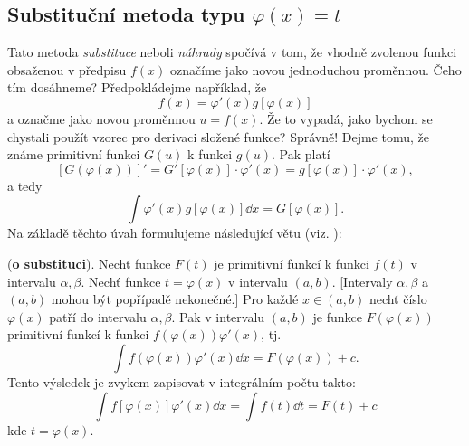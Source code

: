       
  
    \subsection{Substituční metoda typu \(\varphi(x) = t\)}
      Tato metoda \emph{substituce} neboli \emph{náhrady} spočívá v tom, že vhodně zvolenou funkci
      obsaženou v předpisu \(f(x)\) označíme jako novou jednoduchou proměnnou. Čeho tím dosáhneme?
      Předpokládejme například, že \[f(x)=\varphi'(x)g[\varphi(x)]\] a označme jako novou proměnnou
      \(u = f(x)\). Že to vypadá, jako bychom se chystali použít vzorec pro derivaci složené funkce?
      Správně! Dejme tomu, že známe primitivní funkci \(G(u)\) k funkci \(g(u)\). Pak platí
      \begin{equation*}
        \left[G\left(\varphi(x)\right)\right]' = G'\left[\varphi(x)\right]\cdot\varphi'(x) 
        = g\left[\varphi(x)\right]\cdot\varphi'(x),     
      \end{equation*}
      a tedy
      \begin{equation*}
        \int \varphi'(x) g\left[\varphi(x)\right]\dd{x} =  G\left[\varphi(x)\right]. 
      \end{equation*}      
      Na základě těchto úvah formulujeme následující větu (viz. \cite[p.~142]{diblik2002}):
      \begin{mdframed}[style=mdmathlemma]
        \begin{lemma}\label{mai:lemma009}          
          (\textbf{o substituci}). Nechť funkce \(F(t)\) je primitivní funkcí k funkci \(f(t)\) v
          intervalu \(\alpha, \beta\). Nechť funkce \(t = \varphi(x)\) v intervalu \((a,b)\).
          [Intervaly \(\alpha, \beta\) a \((a,b)\) mohou být popřípadě nekonečné.] Pro každé
          \(x\in(a,b)\) nechť číslo \(\varphi(x)\) patří do intervalu \(\alpha, \beta\). Pak v
          intervalu \((a,b)\) je funkce \(F(\varphi(x))\) primitivní funkcí k funkci
          \(f(\varphi(x))\varphi'(x)\), tj. 
          \begin{equation}\label{mai:eq176}
            \int{f(\varphi(x))\varphi'(x)\dd{x}} = F(\varphi(x)) + c.
          \end{equation}
          Tento výsledek je zvykem zapisovat v integrálním počtu takto:
          \begin{equation}\label{mai:eq177}
            \int{f[\varphi(x)]\varphi'(x)\dd{x}}= \int f(t)\dd{t}= F(t)+c
          \end{equation}
          kde \(t=\varphi(x)\).
        \end{lemma}
      \end{mdframed}
  
